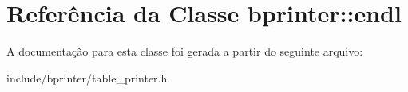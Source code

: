\hypertarget{classbprinter_1_1endl}{}\section{Referência da Classe bprinter\+:\+:endl}
\label{classbprinter_1_1endl}


A documentação para esta classe foi gerada a partir do seguinte arquivo\+:\begin{DoxyCompactItemize}
\item 
include/bprinter/table\+\_\+printer.\+h\end{DoxyCompactItemize}
